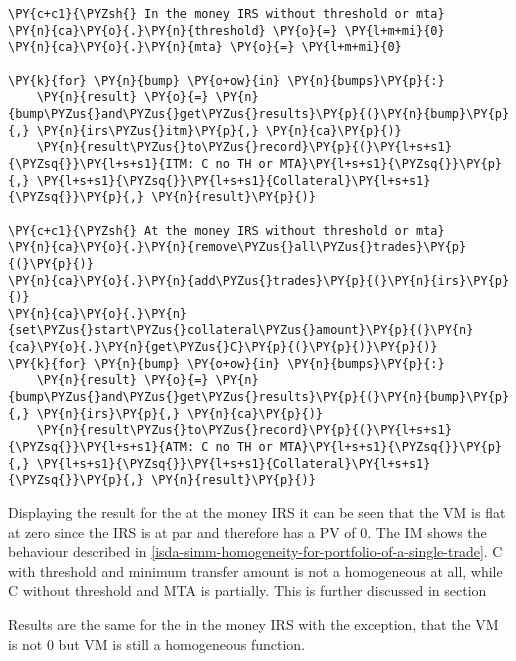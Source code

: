 \begin{tcolorbox}[breakable, size=fbox, boxrule=1pt, pad at break*=1mm,colback=cellbackground, colframe=cellborder]
\begin{Verbatim}[commandchars=\\\{\}]
\PY{c+c1}{\PYZsh{} In the money IRS without threshold or mta}
\PY{n}{ca}\PY{o}{.}\PY{n}{threshold} \PY{o}{=} \PY{l+m+mi}{0}
\PY{n}{ca}\PY{o}{.}\PY{n}{mta} \PY{o}{=} \PY{l+m+mi}{0}

\PY{k}{for} \PY{n}{bump} \PY{o+ow}{in} \PY{n}{bumps}\PY{p}{:}
    \PY{n}{result} \PY{o}{=} \PY{n}{bump\PYZus{}and\PYZus{}get\PYZus{}results}\PY{p}{(}\PY{n}{bump}\PY{p}{,} \PY{n}{irs\PYZus{}itm}\PY{p}{,} \PY{n}{ca}\PY{p}{)}
    \PY{n}{result\PYZus{}to\PYZus{}record}\PY{p}{(}\PY{l+s+s1}{\PYZsq{}}\PY{l+s+s1}{ITM: C no TH or MTA}\PY{l+s+s1}{\PYZsq{}}\PY{p}{,} \PY{l+s+s1}{\PYZsq{}}\PY{l+s+s1}{Collateral}\PY{l+s+s1}{\PYZsq{}}\PY{p}{,} \PY{n}{result}\PY{p}{)}

\PY{c+c1}{\PYZsh{} At the money IRS without threshold or mta}
\PY{n}{ca}\PY{o}{.}\PY{n}{remove\PYZus{}all\PYZus{}trades}\PY{p}{(}\PY{p}{)}
\PY{n}{ca}\PY{o}{.}\PY{n}{add\PYZus{}trades}\PY{p}{(}\PY{n}{irs}\PY{p}{)}
\PY{n}{ca}\PY{o}{.}\PY{n}{set\PYZus{}start\PYZus{}collateral\PYZus{}amount}\PY{p}{(}\PY{n}{ca}\PY{o}{.}\PY{n}{get\PYZus{}C}\PY{p}{(}\PY{p}{)}\PY{p}{)}
\PY{k}{for} \PY{n}{bump} \PY{o+ow}{in} \PY{n}{bumps}\PY{p}{:}
    \PY{n}{result} \PY{o}{=} \PY{n}{bump\PYZus{}and\PYZus{}get\PYZus{}results}\PY{p}{(}\PY{n}{bump}\PY{p}{,} \PY{n}{irs}\PY{p}{,} \PY{n}{ca}\PY{p}{)}
    \PY{n}{result\PYZus{}to\PYZus{}record}\PY{p}{(}\PY{l+s+s1}{\PYZsq{}}\PY{l+s+s1}{ATM: C no TH or MTA}\PY{l+s+s1}{\PYZsq{}}\PY{p}{,} \PY{l+s+s1}{\PYZsq{}}\PY{l+s+s1}{Collateral}\PY{l+s+s1}{\PYZsq{}}\PY{p}{,} \PY{n}{result}\PY{p}{)}
\end{Verbatim}
\end{tcolorbox}

    Displaying the result for the at the money IRS it can be seen that the
VM is flat at zero since the IRS is at par and therefore has a PV of 0.
The IM shows the behaviour described in
\ref{isda-simm-homogeneity-for-portfolio-of-a-single-trade}. C with
threshold and minimum transfer amount is not a homogeneous at all, while
C without threshold and MTA is partially. This is further discussed in
section 

    Results are the same for the in the money IRS with the exception, that
the VM is not 0 but VM is still a homogeneous function.


